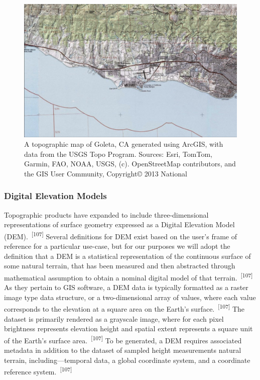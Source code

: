 \documentclass{article}
\begin{document}
\begin{figure}
    \centering
    \includegraphics[width=1.0\linewidth]{images/us-topo-goleta.png}
    \caption{A topographic map of Goleta, CA generated using ArcGIS, with data from the USGS Topo Program. Sources: Esri, TomTom, Garmin, FAO, NOAA, USGS, (c). OpenStreetMap contributors, and the GIS User Community, Copyright© 2013 National}
    \label{figure29}
\end{figure}


\subsubsection{Digital Elevation Models}

\par{Topographic products have expanded to include three-dimensional representations of surface geometry expressed as a Digital Elevation Model (DEM).~\textsuperscript{[107]} Several definitions for DEM exist based on the user's frame of reference for a particular use-case, but for our purposes we will adopt the definition that a DEM is a statistical representation of the continuous surface of some natural terrain, that has been measured and then abstracted through mathematical assumption to obtain a nominal digital model of that terrain.~\textsuperscript{[107]} As they pertain to GIS software, a DEM data is typically formatted as a raster image type data structure, or a two-dimensional array of values, where each value corresponds to the elevation at a square area on the Earth's surface.~\textsuperscript{[107]} The dataset is primarily rendered as a grayscale image, where for each pixel brightness represents elevation height and spatial extent represents a square unit of the Earth's surface area.~\textsuperscript{[107]} To be generated, a DEM requires associated metadata in addition to the dataset of sampled height measurements natural terrain, including---temporal data, a global coordinate system, and a coordinate reference system.~\textsuperscript{[107]}} 
\end{document}
